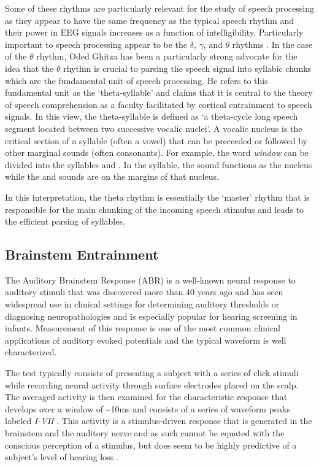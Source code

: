 \documentclass[titlepage]{article}
\begin{document}
    Some of these rhythms are particularly relevant for the study of speech processing as they appear
    to have the same frequency as the typical speech rhythm and their power in EEG signals increases
    as a function of intelligibility. Particularly important to speech processing appear to be
    the $\delta$, $\gamma$, and $\theta$ rhythms \cite{Ghitza2009,Meyer2018}. In the case of the
    $\theta$ rhythm, Oded Ghitza has been a particularly strong advocate for the idea that the
    $\theta$ rhythm is crucial to parsing the speech signal into syllabic chunks which are the
    fundamental unit of speech processing. He refers to this fundamental unit as the `theta-syllable'
    \cite{Ghitza2013a} and claims that it is central to the theory of speech comprehension as a
    faculty facilitated by cortical entrainment to speech signals. In this view, the theta-syllable
    is defined as `a theta-cycle long speech segment located between two successive vocalic nuclei'.
    A vocalic nucleus is the critical section of a syllable (often a vowel) that can be preceeded
    or followed by other marginal sounds (often consonants). For example, the word \textit{window}
    can be divided into the syllables  and . In the 
    syllable, the  sound functions as the nucleus while the  and 
    sounds are on the margins of that nucleus.

    In this interpretation, the theta rhythm is essentially the `master' rhythm that is responsible
    for the main chunking of the incoming speech stimulus and leads to the efficient parsing of
    syllables.

  \subsection{Brainstem Entrainment} \label{brainstemEntrainment}

    The Auditory Brainstem Response (ABR) is a well-known neural response
    to auditory stimuli that was discovered more than 40 years ago \cite{Jewett1971,Jewett1970}
    and has seen widespread use in clinical settings for determining auditory thresholds
    or diagnosing neuropathologies \cite{Skoe2010} and is especially popular for hearing screening in infants.
    Measurement of this response is one of the
    most common clinical applications of auditory evoked potentials and the typical waveform is well
    characterized.

    The test typically consists of presenting a subject with a series of click stimuli while recording
    neural activity through surface electrodes placed on the scalp. The averaged activity is then examined
    for the characteristic response that develops over a window of \textasciitilde 10ms and consists of
    a series of waveform peaks labeled \textit{I-VII} \cite{Sininger1993,Bhattacharyya2017}. This activity
    is a stimulus-driven response that is generated in the brainstem and the auditory nerve and as such
    cannot be equated with the conscious perception of a stimulus, but does seem to be highly predictive of
    a subject's level of hearing loss \cite{Sininger1993}.
\end{document}
